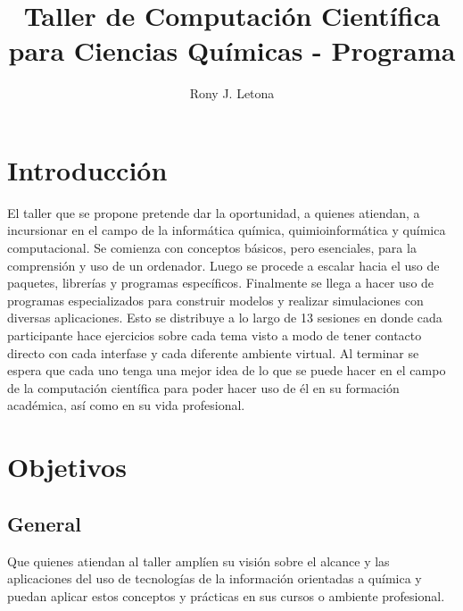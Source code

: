 \documentclass[10pt,letterpaper]{article}
\author{Rony J. Letona}
\title{Taller de Computaci\'on Cient\'ifica para Ciencias Qu\'imicas - Programa}
\begin{document}
\maketitle

\section{Introducci\'on}
El taller que se propone pretende dar la oportunidad, a quienes atiendan, a incursionar en el campo de la inform\'atica qu\'imica, quimioinform\'atica y qu\'imica computacional. Se comienza con conceptos b\'asicos, pero esenciales, para la comprensi\'on y uso de un ordenador. Luego se procede a escalar hacia el uso de paquetes, librer\'ias y programas espec\'ificos. Finalmente se llega a hacer uso de programas especializados para construir modelos y realizar simulaciones con diversas aplicaciones. Esto se distribuye a lo largo de 13 sesiones en donde cada participante hace ejercicios sobre cada tema visto a modo de tener contacto directo con cada interfase y cada diferente ambiente virtual. Al terminar se espera que cada uno tenga una mejor idea de lo que se puede hacer en el campo de la computaci\'on cient\'ifica para poder hacer uso de \'el en su formaci\'on acad\'emica, as\'i como en su vida profesional.

\section{Objetivos}
\subsection{General}
Que quienes atiendan al taller ampl\'ien su visi\'on sobre el alcance y las aplicaciones del uso de tecnolog\'ias de la informaci\'on orientadas a qu\'imica y puedan aplicar estos conceptos y pr\'acticas en sus cursos o ambiente profesional.
\end{document}
